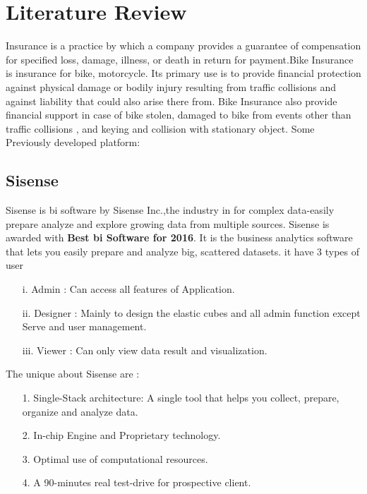 \chapter{Literature Review}
Insurance is a practice by which a company provides a guarantee of compensation for specified loss, damage, illness, or death in return for payment.Bike Insurance is insurance for bike, motorcycle. Its primary use is to provide financial protection against physical damage or bodily injury resulting from traffic collisions and against liability that could also arise there from. Bike Insurance also provide financial support in case of bike stolen, damaged to bike from events other than traffic collisions , and keying and collision with stationary object. \cite{insurance2015bike}
Some Previously developed platform:
\par
\section{Sisense}
 \par
Sisense is \acl{bi} software by Sisense Inc.,the  industry in for complex data-easily prepare analyze and explore growing  data from multiple sources. Sisense is awarded with \textbf{Best \acl{bi} Software for    2016}. It is the business analytics software that lets you easily
prepare and analyze big, scattered datasets. it have 3 types of user 
\begin{enumerate}
\item[i.] Admin : Can access all features of Application.
\item[ii.] Designer : Mainly to design the elastic cubes and all admin function except Serve and user management.
\item[iii.] Viewer : Can only view data result and visualization.
\end{enumerate}
\par The  unique about Sisense are :

\begin{enumerate}
\item[1.] Single-Stack architecture: A single tool that helps you collect, prepare, organize and analyze data.
\item[2.] In-chip Engine and Proprietary technology.
\item[3.] Optimal use of computational resources.
\item[4.] A 90-minutes real test-drive for prospective client.
\end{enumerate}
\par
